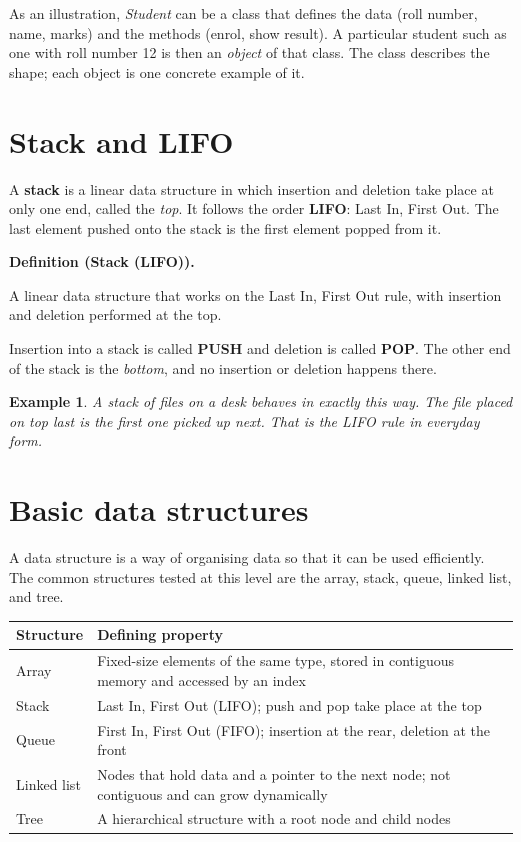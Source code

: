 \documentclass[11pt]{article}
\newtheorem{example}{Example}[section]
\newenvironment{definitionbox}[1]{%
  \par\noindent\textbf{Definition (#1).}\ \itshape
}{\par\vspace{0.3em}}
\begin{document}
As an illustration, \emph{Student} can be a class that defines the data
(roll number, name, marks) and the methods (enrol, show result). A particular
student such as one with roll number 12 is then an \emph{object} of that class.
The class describes the shape; each object is one concrete example of it.

\section{Stack and LIFO}
A \textbf{stack} is a linear data structure in which insertion and deletion
take place at only one end, called the \emph{top}. It follows the order
\textbf{LIFO}: Last In, First Out. The last element pushed onto the stack is
the first element popped from it.

\begin{definitionbox}{Stack (LIFO)}
A linear data structure that works on the Last In, First Out rule, with
insertion and deletion performed at the top.
\end{definitionbox}

Insertion into a stack is called \textbf{PUSH} and deletion is called
\textbf{POP}. The other end of the stack is the \emph{bottom}, and no
insertion or deletion happens there.

\begin{example}
A stack of files on a desk behaves in exactly this way. The file placed on top
last is the first one picked up next. That is the LIFO rule in everyday form.
\end{example}

\section{Basic data structures}
A data structure is a way of organising data so that it can be used
efficiently. The common structures tested at this level are the array, stack,
queue, linked list, and tree.

\begin{center}
\begin{tabular}{p{}p{}}
\toprule
\textbf{Structure} & \textbf{Defining property} \\
\midrule
Array & Fixed-size elements of the same type, stored in contiguous memory and accessed by an index \\
Stack & Last In, First Out (LIFO); push and pop take place at the top \\
Queue & First In, First Out (FIFO); insertion at the rear, deletion at the front \\
Linked list & Nodes that hold data and a pointer to the next node; not contiguous and can grow dynamically \\
Tree & A hierarchical structure with a root node and child nodes \\
\bottomrule
\end{tabular}
\end{center}
\end{document}
